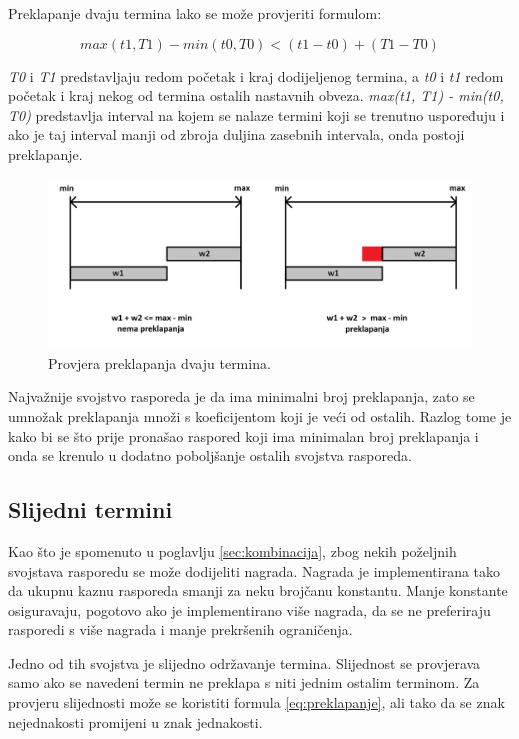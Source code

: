 \documentclass[times, utf8, zavrsni]{fer}
\begin{document}
Preklapanje dvaju termina lako se može provjeriti formulom:

\begin{equation}
max(t1, T1) - min(t0, T0) < (t1 - t0) + (T1  - T0)
\label{eq:preklapanje}
\end{equation}

\emph{T0} i \emph{T1} predstavljaju redom početak i kraj dodijeljenog termina, a \emph{t0} i \emph{t1} redom početak i kraj nekog od termina ostalih nastavnih obveza. \emph{max(t1, T1) - min(t0, T0)} predstavlja interval na kojem se nalaze termini koji se trenutno uspoređuju i ako je taj interval manji od zbroja duljina zasebnih intervala, onda postoji preklapanje.

\begin{figure}[htb]
\centering
\includegraphics[width=15cm]{images/preklapanja.png}
\caption{Provjera preklapanja dvaju termina.}
\label{fig:preklapanja}
\end{figure}

Najvažnije svojstvo rasporeda je da ima minimalni broj preklapanja, zato se umnožak preklapanja množi s koeficijentom koji je veći od ostalih. Razlog tome je kako bi se što prije pronašao raspored koji ima minimalan broj preklapanja i onda se krenulo u dodatno poboljšanje ostalih svojstva rasporeda.

\subsection{Slijedni termini}

Kao što je spomenuto u poglavlju \ref{sec:kombinacija}, zbog nekih poželjnih svojstava rasporedu se može dodijeliti nagrada. Nagrada je implementirana tako da ukupnu kaznu rasporeda smanji za neku brojčanu konstantu. Manje konstante osiguravaju, pogotovo ako je implementirano više nagrada, da se ne preferiraju rasporedi s više nagrada i manje prekršenih ograničenja. 

Jedno od tih svojstva je slijedno održavanje termina. Slijednost se provjerava samo ako se navedeni termin ne preklapa s niti jednim ostalim terminom. Za provjeru slijednosti može se koristiti formula \ref{eq:preklapanje}, ali tako da se znak nejednakosti promijeni u znak jednakosti.
\end{document}
